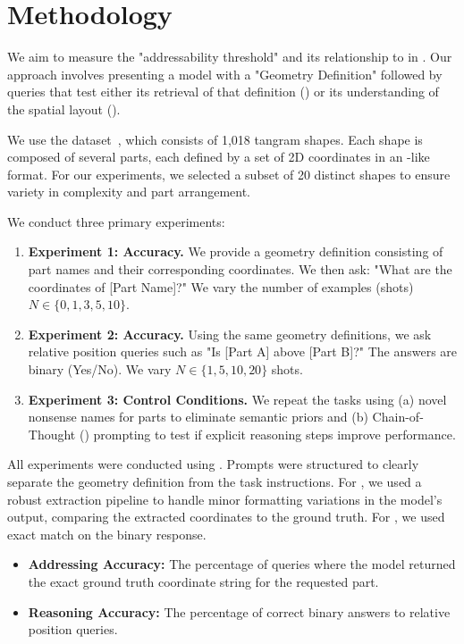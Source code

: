 \section{Methodology}
\label{sec:method}

We aim to measure the "addressability threshold" and its relationship to \reasoning in \gpt. Our approach involves presenting a model with a "Geometry Definition" followed by queries that test either its retrieval of that definition (\addressing) or its understanding of the spatial layout (\reasoning).

We use the \kilogram dataset~\cite{ji2022kilogram}, which consists of 1,018 tangram shapes. Each shape is composed of several parts, each defined by a set of 2D coordinates in an \svg-like format. For our experiments, we selected a subset of 20 distinct shapes to ensure variety in complexity and part arrangement.

We conduct three primary experiments:
\begin{enumerate}[leftmargin=*,itemsep=0pt,topsep=0pt]
    \item {\bf Experiment 1: \addressing Accuracy.} We provide a geometry definition consisting of part names and their corresponding coordinates. We then ask: "What are the coordinates of [Part Name]?" We vary the number of examples (shots) $N \in \{0, 1, 3, 5, 10\}$.
    \item {\bf Experiment 2: \reasoning Accuracy.} Using the same geometry definitions, we ask relative position queries such as "Is [Part A] above [Part B]?" The answers are binary (Yes/No). We vary $N \in \{1, 5, 10, 20\}$ shots.
    \item {\bf Experiment 3: Control Conditions.} We repeat the \reasoning tasks using (a) novel nonsense names for parts to eliminate semantic priors and (b) Chain-of-Thought (\cotask) prompting to test if explicit reasoning steps improve performance.
\end{enumerate}

All experiments were conducted using \gpt. Prompts were structured to clearly separate the geometry definition from the task instructions. For \addressing, we used a robust extraction pipeline to handle minor formatting variations in the model's output, comparing the extracted coordinates to the ground truth. For \reasoning, we used exact match on the binary response.

\begin{itemize}[leftmargin=*,itemsep=0pt,topsep=0pt]
    \item {\bf Addressing Accuracy:} The percentage of queries where the model returned the exact ground truth coordinate string for the requested part.
    \item {\bf Reasoning Accuracy:} The percentage of correct binary answers to relative position queries.
\end{itemize}
